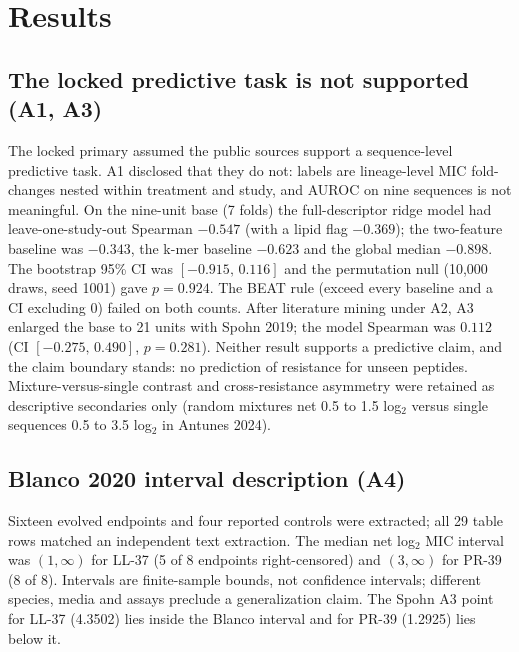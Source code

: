 \documentclass[11pt,letterpaper]{article}
\begin{document}
\section{Results}
\subsection{The locked predictive task is not supported (A1, A3)}
The locked primary assumed the public sources support a sequence-level predictive task. A1 disclosed that they do not: labels are lineage-level MIC fold-changes nested within treatment and study, and AUROC on nine sequences is not meaningful. On the nine-unit base (7 folds) the full-descriptor ridge model had leave-one-study-out Spearman $-0.547$ (with a lipid flag $-0.369$); the two-feature baseline was $-0.343$, the k-mer baseline $-0.623$ and the global median $-0.898$. The bootstrap 95\% CI was $[-0.915,\,0.116]$ and the permutation null (10{,}000 draws, seed 1001) gave $p=0.924$. The BEAT rule (exceed every baseline and a CI excluding 0) failed on both counts. After literature mining under A2, A3 enlarged the base to 21 units with Spohn 2019; the model Spearman was $0.112$ (CI $[-0.275,\,0.490]$, $p=0.281$). Neither result supports a predictive claim, and the claim boundary stands: no prediction of resistance for unseen peptides. Mixture-versus-single contrast and cross-resistance asymmetry were retained as descriptive secondaries only (random mixtures net 0.5 to 1.5 log$_2$ versus single sequences 0.5 to 3.5 log$_2$ in Antunes 2024).

\subsection{Blanco 2020 interval description (A4)}
Sixteen evolved endpoints and four reported controls were extracted; all 29 table rows matched an independent text extraction. The median net log$_2$ MIC interval was $(1,\infty)$ for LL-37 (5 of 8 endpoints right-censored) and $(3,\infty)$ for PR-39 (8 of 8). Intervals are finite-sample bounds, not confidence intervals; different species, media and assays preclude a generalization claim. The Spohn A3 point for LL-37 (4.3502) lies inside the Blanco interval and for PR-39 (1.2925) lies below it.
\end{document}
